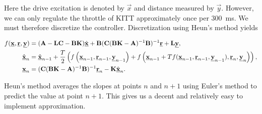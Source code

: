 \documentclass[11pt,titlepage]{report}
\begin{document}
Here the drive excitation is denoted by $\vec{x}$ and distance measured by $\vec{y}$. However, we can only regulate the throttle of KITT approximately once per \SI{300}{ms}. We must therefore discretize the controller. Discretization using Heun's method \cite{wikipedia-heuns} yields

\begin{align}
	f(\mathbf{\underline{x}},\mathbf{\underline{r}},\mathbf{\underline{y}}) &= (\mathbf{A}-\mathbf{L}\mathbf{C}-\mathbf{B}\mathbf{K}) \hat{\mathbf{\underline{x}}} + \mathbf{B}(\mathbf{C}(\mathbf{B} \mathbf{K} - \mathbf{A})^{-1} \mathbf{B})^{-1} \mathbf{\underline{r}} + \mathbf{L} \mathbf{\underline{y}}, \\
	\hat{\mathbf{\underline{x}}}_n &= \hat{\mathbf{\underline{x}}}_{n-1} + \frac{T}{2} \left( f\left(\mathbf{\underline{x}}_{n-1},\mathbf{\underline{r}}_{n-1},\mathbf{\underline{y}}_{n-1} \right) + f\left( \mathbf{\underline{x}}_{n-1} + T f(\mathbf{\underline{x}}_{n-1},\mathbf{\underline{r}}_{n-1},\mathbf{\underline{y}}_{n-1}),\mathbf{\underline{r}}_{n},\mathbf{\underline{y}}_{n}\right) \right), \\
	\mathbf{\underline{x}}_n &= (\mathbf{C}(\mathbf{B} \mathbf{K} - \mathbf{A})^{-1} \mathbf{B})^{-1} \mathbf{\underline{r}}_n - \mathbf{K} \hat{\mathbf{\underline{x}}}_n.
\end{align}

Heun's method averages the slopes at points $n$ and $n+1$ using Euler's method to predict the value at point $n+1$. This gives us a decent and relatively easy to implement approximation.
\end{document}
